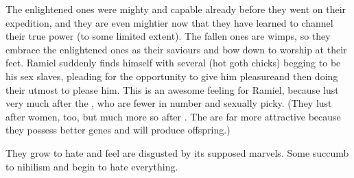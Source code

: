 The enlightened ones were mighty and capable \resphain{} already before they went on their expedition, and they are even mightier now that they have learned to channel their true power (to some limited extent). The fallen ones are wimps, so they embrace the enlightened ones as their saviours and bow down to worship at their feet. Ramiel suddenly finds himself with several \resviel{} (hot goth chicks) begging to be his sex slaves, pleading for the opportunity to give him pleasure\dash and then doing their utmost to please him. This is an awesome feeling for Ramiel, because \resphain{} lust very much after the \resviel, who are fewer in number and sexually picky. (They lust after \human{} women, too, but much more so after \resviel. The \resviel{} are far more attractive because they possess better genes and will produce \resphan{} offspring.)


They grow to hate \Merkyrah{} and feel are disgusted by its supposed marvels. 
Some succumb to nihilism and begin to hate everything. 






